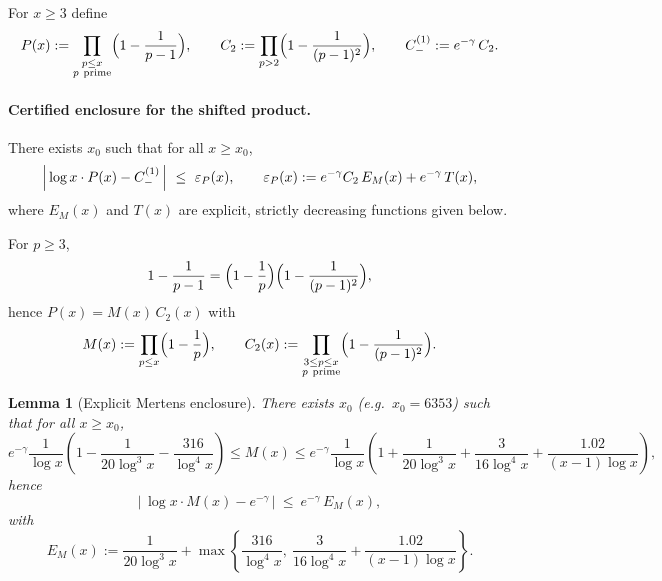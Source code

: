 \documentclass[11pt]{article}
\theoremstyle{inline}
\theoremstyle{break}
\newtheorem{lemma}{Lemma}
\theoremstyle{break}
\theoremstyle{break}
\theoremstyle{break}
\theoremstyle{break}
\theoremstyle{inline}
\newcommand{\xMertens}{6353} %
\begin{document}
For \( x\ge 3 \) define
\begin{equation}
P(x) := \prod_{\substack{p\le x\\ p\ \text{prime}}}\Bigl(1-\frac{1}{p-1}\Bigr),
\qquad
C_2 := \prod_{p>2}\Bigl(1-\frac{1}{(p-1)^2}\Bigr),
\qquad
C_-^{(1)} := e^{-\gamma}\,C_2 .
\end{equation}

\paragraph{Certified enclosure for the shifted product.}\label{thm:shifted-enclosure}
There exists \( x_0 \) such that for all \( x\ge x_0 \),
\begin{equation}
\Bigl|\,\log x\cdot P(x) - C_-^{(1)}\,\Bigr|
\ \le\
\varepsilon_P(x),
\qquad
\varepsilon_P(x) := e^{-\gamma}C_2\,E_M(x) + e^{-\gamma}\,T(x),
\end{equation}
where \( E_M(x) \) and \( T(x) \) are explicit, strictly decreasing functions given below.

\medskip
For \( p\ge 3 \),
\begin{equation}
1-\frac{1}{p-1}=\Bigl(1-\frac{1}{p}\Bigr)\Bigl(1-\frac{1}{(p-1)^2}\Bigr),
\end{equation}
hence \( P(x)=M(x)\,C_2(x) \) with
\begin{equation}
M(x):=\prod_{p\le x}\Bigl(1-\frac{1}{p}\Bigr),\qquad
C_2(x):=\prod_{\substack{3\le p\le x\\ p\ \text{prime}}}\Bigl(1-\frac{1}{(p-1)^2}\Bigr).
\end{equation}

\begin{lemma}[Explicit Mertens enclosure\cite{RosserSchoenfeld1962, Dusart2010}]\label{lem:explicit-mertens}
There exists \( x_0 \) (e.g.\ \( x_0=\xMertens \)) such that for all \( x\ge x_0 \),
\begin{equation}
e^{-\gamma}\frac{1}{\log x}\!\left(1-\frac{1}{20\log^3 x}-\frac{316}{\log^4 x}\right)
\le M(x) \le
e^{-\gamma}\frac{1}{\log x}\!\left(1+\frac{1}{20\log^3 x}+\frac{3}{16\log^4 x}
+\frac{1.02}{(x-1)\log x}\right),
\end{equation}
hence
\begin{equation}
\bigl|\,\log x\cdot M(x)-e^{-\gamma}\,\bigr|\ \le\ e^{-\gamma}\,E_M(x),
\end{equation}
with
\begin{equation}
E_M(x) := \frac{1}{20\log^3 x}+\max\!\left\{\frac{316}{\log^4 x},\ \frac{3}{16\log^4 x}+\frac{1.02}{(x-1)\log x}\right\}.
\end{equation}
\end{lemma}
\end{document}
